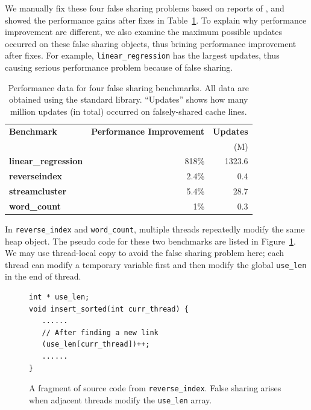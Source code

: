 We manually fix these four false sharing problems based on reports of \SheriffDetect{}, and showed the performance gains after fixes in Table~\ref{table:perfafterfix}. To explain why performance improvement are different, we also examine the maximum possible updates occurred on these false sharing objects, thus brining performance improvement after fixes. For example, \texttt{linear\_regression} has the largest updates, thus causing serious performance problem because of false sharing. 

\begin{table}
\centering
\begin{tabular}{l|r|r}
\hline
{\bf \small Benchmark} & {\bf \small Performance Improvement} & {\bf \small Updates}\\
 & & (M)\\
\hline
\small \textbf{linear\_regression} & 818\% & 1323.6\\
\small \textbf{reverseindex} &  2.4\% & 0.4\\
\small \textbf{streamcluster} & 5.4\% & 28.7\\
\small \textbf{word\_count} &  1\% & 0.3\\
\hline
\end{tabular}
\caption{Performance data for four false sharing benchmarks. All data are obtained using the standard \pthreads{} library. ``Updates'' shows how many million updates (in total) occurred on falsely-shared cache lines.
\label{table:perfafterfix}}
\end{table}


In \texttt{reverse\_index} and \texttt{word\_count}, multiple threads repeatedly modify the same heap object. The pseudo code for these two benchmarks are listed in Figure~\ref{fig:reverseindex}. We may use thread-local copy to avoid the false sharing problem here; each thread can modify a temporary variable first and then modify the global \texttt{use\_len} in the end of thread.

\begin{figure}[!t]
\begin{lstlisting}[style=tt]
int * use_len;
void insert_sorted(int curr_thread) {
   ......	
   // After finding a new link
   (use_len[curr_thread])++;
   ......	
}
\end{lstlisting}
\caption{A fragment of source code from \texttt{reverse\_index}. False sharing arises when adjacent threads 
modify the \texttt{use\_len} array. 
\label{fig:reverseindex}}
\end{figure}

